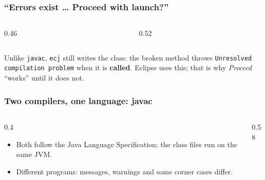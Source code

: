 \documentclass[aspectratio=169,10pt,compress]{beamer}
\begin{document}
\begin{frame}[t,fragile] \frametitle{``Errors exist \dots{} Proceed with launch?''}
  \begin{columns}[T]
    \begin{column}{0.46\textwidth}
    \end{column}
    \begin{column}{0.52\textwidth}
    \end{column}
  \end{columns}
  \small Unlike \texttt{javac}, \texttt{ecj} still writes the class: the broken method throws \texttt{Unresolved compilation problem}
  when it is \textbf{called}. Eclipse uses this; that is why \emph{Proceed} ``works'' until it does not.
\end{frame}





\begin{frame}[t,fragile] \frametitle{Two compilers, one language: javac}
  \begin{columns}[T]
    \begin{column}{0.4\textwidth}
      \begin{itemize}\small
        \item Both follow the Java Language Specification; the class files run on the same JVM.
        \item Different programs: messages, warnings and some corner cases differ.
      \end{itemize}
    \end{column}
    \begin{column}{0.58\textwidth}
    \end{column}
  \end{columns}
\end{frame}
\end{document}

